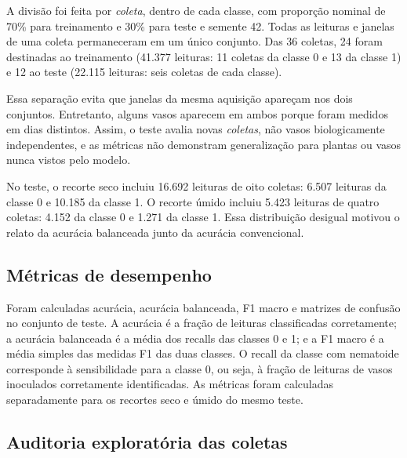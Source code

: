 A divisão foi feita por \emph{coleta}, dentro de cada classe, com
proporção nominal de 70\% para treinamento e 30\% para teste e semente 42.
Todas as leituras e janelas de uma coleta permaneceram em um único conjunto.
Das 36 coletas, 24 foram destinadas ao treinamento (41.377 leituras: 11
coletas da classe 0 e 13 da classe 1) e 12 ao teste (22.115 leituras:
seis coletas de cada classe).

Essa separação evita que janelas da mesma aquisição apareçam nos dois
conjuntos. Entretanto, alguns vasos aparecem em ambos porque foram medidos
em dias distintos. Assim, o teste avalia novas \emph{coletas}, não vasos
biologicamente independentes, e as métricas não demonstram generalização
para plantas ou vasos nunca vistos pelo modelo.

No teste, o recorte seco incluiu 16.692 leituras de oito coletas: 6.507
leituras da classe 0 e 10.185 da classe 1. O recorte úmido incluiu 5.423
leituras de quatro coletas: 4.152 da classe 0 e 1.271 da classe 1. Essa
distribuição desigual motivou o relato da acurácia balanceada junto da
acurácia convencional.

\subsection{Métricas de desempenho}
\label{subsec:metricas}

Foram calculadas acurácia, acurácia balanceada, F1 macro e matrizes de
confusão no conjunto de teste. A acurácia é a fração de leituras
classificadas corretamente; a acurácia balanceada é a média dos recalls
das classes 0 e 1; e a F1 macro é a média simples das medidas F1 das duas
classes. O recall da classe com nematoide corresponde à sensibilidade
para a classe 0, ou seja, à fração de leituras de vasos inoculados
corretamente identificadas. As métricas foram calculadas separadamente
para os recortes seco e úmido do mesmo teste.


\subsection{Auditoria exploratória das coletas}
\label{subsec:auditoria_coletas_loso}

